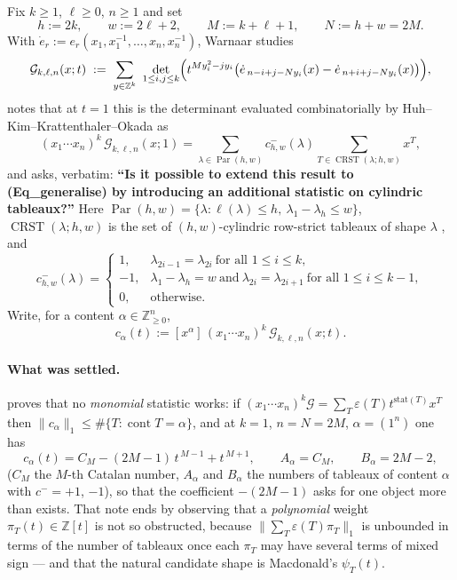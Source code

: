 \documentclass[11pt]{article}
\theoremstyle{definition}
\DeclareMathOperator{\Par}{Par}
\DeclareMathOperator{\CRST}{CRST}
\DeclareMathOperator{\cont}{cont}
\newcommand{\la}{\lambda}
\newcommand{\Z}{\mathbb{Z}}
\newcommand{\edot}{\dot{e}}
\begin{document}
Fix $k\ge1$, $\ell\ge0$, $n\ge1$ and set
\[
  h:=2k,\qquad w:=2\ell+2,\qquad M:=k+\ell+1,\qquad N:=h+w=2M .
\]
With $\edot_r:=e_r(x_1,x_1^{-1},\dots,x_n,x_n^{-1})$, Warnaar
\cite[\S6, (Eq\_generalise)]{W} studies
\begin{equation}\label{eq:gen}
  \mathcal G_{k,\ell,n}(x;t)\;:=\;
  \sum_{y\in\Z^{k}}\ \det_{1\le i,j\le k}
  \Bigl(t^{M y_i^{2}-j y_i}\bigl(
     \edot_{\,n-i+j-N y_i}(x)-\edot_{\,n+i+j-N y_i}(x)\bigr)\Bigr),
\end{equation}
notes that at $t=1$ this is the determinant evaluated combinatorially by
Huh--Kim--Krattenthaler--Okada \cite[Thm.~3.3]{HKKO} as
\begin{equation}\label{eq:C-}
 (x_1\cdots x_n)^{k}\,\mathcal G_{k,\ell,n}(x;1)
 =\sum_{\la\in\Par(h,w)} c^{-}_{h,w}(\la)\!\!\sum_{T\in\CRST(\la;h,w)}\!\!x^{T},
\end{equation}
and asks, verbatim: \textbf{``Is it possible to extend this result to
(Eq\_generalise) by introducing an additional statistic on cylindric
tableaux?''} Here $\Par(h,w)=\{\la:\ell(\la)\le h,\ \la_1-\la_h\le w\}$,
$\CRST(\la;h,w)$ is the set of $(h,w)$-cylindric row-strict tableaux of shape
$\la$ \cite[Defn.~2.1, Prop.~2.6]{HKKO}, and
\begin{equation}\label{eq:cminus}
c^{-}_{h,w}(\la)=
\begin{cases}
1,&\la_{2i-1}=\la_{2i}\ \text{for all }1\le i\le k,\\
-1,&\la_1-\la_{h}=w\ \text{and}\ \la_{2i}=\la_{2i+1}\ \text{for all }1\le i\le k-1,\\
0,&\text{otherwise.}
\end{cases}
\end{equation}
Write, for a content $\alpha\in\Z_{\ge0}^{n}$,
\[
  c_\alpha(t):=[x^{\alpha}]\,(x_1\cdots x_n)^{k}\,\mathcal G_{k,\ell,n}(x;t).
\]

\paragraph{What was settled.} \cite[Thm.~1]{Cq405} proves that no
\emph{monomial} statistic works: if
$(x_1\cdots x_n)^k\mathcal G=\sum_T\varepsilon(T)t^{\mathrm{stat}(T)}x^T$
then $\|c_\alpha\|_1\le\#\{T:\cont T=\alpha\}$, and at $k=1$,
$n=N=2M$, $\alpha=(1^n)$ one has
\begin{equation}\label{eq:witness}
  c_\alpha(t)=C_M-(2M-1)\,t^{\,M-1}+t^{\,M+1},\qquad
  A_\alpha=C_M,\qquad B_\alpha=2M-2,
\end{equation}
($C_M$ the $M$-th Catalan number, $A_\alpha$ and $B_\alpha$ the numbers of
tableaux of content $\alpha$ with $c^-=+1$, $-1$), so that the coefficient
$-(2M-1)$ asks for one object more than exists. That note ends by observing
that a \emph{polynomial} weight $\pi_T(t)\in\Z[t]$ is not so obstructed,
because $\|\sum_T\varepsilon(T)\pi_T\|_1$ is unbounded in terms of the number
of tableaux once each $\pi_T$ may have several terms of mixed sign --- and
that the natural candidate shape is Macdonald's $\psi_T(t)$.
\end{document}
